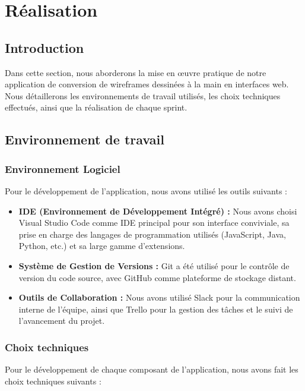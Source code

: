 \chapter{Réalisation}
\label{chap:realisation}

\section{Introduction}

Dans cette section, nous aborderons la mise en œuvre pratique de notre application de conversion de wireframes dessinées à la main en interfaces web. Nous détaillerons les environnements de travail utilisés, les choix techniques effectués, ainsi que la réalisation de chaque sprint.

\section{Environnement de travail}

\subsection{Environnement Logiciel}

Pour le développement de l'application, nous avons utilisé les outils suivants :

\begin{itemize}
    \item \textbf{IDE (Environnement de Développement Intégré) :} Nous avons choisi Visual Studio Code comme IDE principal pour son interface conviviale, sa prise en charge des langages de programmation utilisés (JavaScript, Java, Python, etc.) et sa large gamme d'extensions.
    \item \textbf{Système de Gestion de Versions :} Git a été utilisé pour le contrôle de version du code source, avec GitHub comme plateforme de stockage distant.
    \item \textbf{Outils de Collaboration :} Nous avons utilisé Slack pour la communication interne de l'équipe, ainsi que Trello pour la gestion des tâches et le suivi de l'avancement du projet.
\end{itemize}

\subsection{Choix techniques}

Pour le développement de chaque composant de l'application, nous avons fait les choix techniques suivants :


